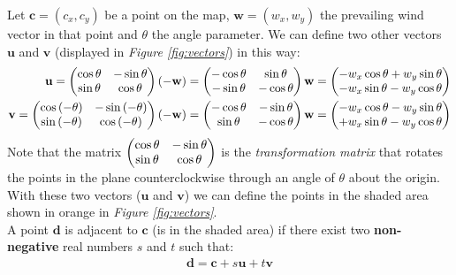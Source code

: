 \documentclass[11pt,a4paper]{article}
\begin{document}
Let $\mathbf{c} = (c_x, c_y)$ be a point on the map, $\mathbf{w} = (w_x, w_y)$ the prevailing wind vector in that point and $\theta$ the angle parameter. We can define two other vectors $\mathbf{u}$ and $\mathbf{v}$ (displayed in \textit{Figure \ref{fig:vectors}}) in this way:
\begin{align}
    \mathbf{u} =
    \begin{pmatrix}
        \cos{\theta} & -\sin{\theta}\cr
        \sin{\theta} & \cos{\theta}
    \end{pmatrix}
    (-\mathbf{w}) =
    \begin{pmatrix}
        -\cos{\theta} & \sin{\theta}\cr
        -\sin{\theta} & -\cos{\theta}
    \end{pmatrix}
    \mathbf{w} =
    \begin{pmatrix}
        -w_x\cos{\theta} + w_y\sin{\theta}\cr
        -w_x\sin{\theta} - w_y\cos{\theta}
    \end{pmatrix} \\
    \mathbf{v} =
    \begin{pmatrix}
        \cos{(-\theta)} & -\sin{(-\theta)}\cr
        \sin{(-\theta)} & \cos{(-\theta)}
    \end{pmatrix}
    (-\mathbf{w}) =
    \begin{pmatrix}
        -\cos{\theta} & -\sin{\theta}\cr
        \sin{\theta}  & -\cos{\theta}
    \end{pmatrix}
    \mathbf{w} =
    \begin{pmatrix}
        -w_x\cos{\theta} - w_y\sin{\theta}\cr
        +w_x\sin{\theta} - w_y\cos{\theta}
    \end{pmatrix}
\end{align}
Note that the matrix $\begin{pmatrix}\cos{\theta} & -\sin{\theta} \cr \sin{\theta} & \cos{\theta}\end{pmatrix}$ is the \textit{transformation matrix} that rotates the points in the plane counterclockwise through an angle of $\theta$ about the origin.
\\[2mm]
With these two vectors ($\mathbf{u}$ and $\mathbf{v}$) we can define the points in the shaded area shown in orange in \textit{Figure \ref{fig:vectors}}.
\\
A point $\mathbf{d}$ is adjacent to $\mathbf{c}$ (is in the shaded area) if there exist two \textbf{non-negative} real numbers $s$ and $t$ such that:
\begin{align}
    \label{eq:shaded_area}
    \mathbf{d} = \mathbf{c} + s \mathbf{u} + t \mathbf{v}
\end{align}
\end{document}
